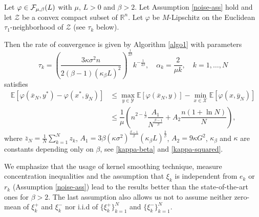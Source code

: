 \documentclass[runningheads]{llncs}
\def \R {\mathbb R}
\def\R{\mathbb{R}}
\newcommand{\E}{{\mathbb E}}
\def\R{\mathbb R}
\def\E{\mathbb E}
\begin{document}
\begin{theorem} \label{theorem_highorder_smooth_strongly_convex}
Let $\varphi \in {\cal F}_{\mu, \beta}(L)$ with $\mu$, $L > 0$ and $\beta > 2$. 
Let Assumption \ref{noise-ass} hold 
and let $\mathcal{Z}$ be a convex compact subset of $\R^n$.
Let $\varphi$ be $M$-Lipschitz on the Euclidean $\tau_1$-neighborhood of $\mathcal{Z}$ (see $\tau_k$ below). 

Then the rate of convergence is given by Algorithm \ref{algo1} with parameters
\begin{equation*}
    \tau_k = \left(\dfrac{3\kappa\sigma^2n}{2(\beta-1)(\kappa_\beta L)^2}\right)^{\frac{1}{2\beta}}k^{-\frac{1}{2\beta}}, \quad \alpha_k=\dfrac{2}{\mu k}, \quad k =1,\dots, N
\end{equation*}
satisfies 
\begin{equation*}
\begin{split}
    \E \left[ \varphi(\overline{x}_N, y^*) - \varphi(x^*, \overline{y}_N) \right] &\leq \max_{y\in \mathcal{Y}} \E \left[\varphi(\overline{x}_N, y)  \right] -
    \min_{x\in \mathcal{X}}\E \left[\varphi(x, \overline{y}_N) \right] \\
    &\leq \dfrac{1}{\mu} \left(n^{2-\frac{1}{\beta}}\dfrac{A_1}{N^{\frac{\beta-1}{\beta}}}+A_2\dfrac{n(1+\ln N)}{N} \right),
\end{split}
\end{equation*}
where $\overline{z}_N = \frac{1}{N}\sum\limits_{k=1}^N z_k$, $A_1=3\beta(\kappa \sigma^2)^{\frac{\beta-1}{\beta}}(\kappa_{\beta}L)^{\frac{2}{\beta}}$, $A_2=9\kappa G^2$, $\kappa_{\beta}$ and $\kappa$ are constants depending only on $\beta$, see \eqref{kappa-beta} and \eqref{kappa-squared}.
\end{theorem}

We emphasize that the usage of kernel smoothing technique, measure concentration inequalities and the assumption that $\xi_k$ is independent from $e_k$ or $r_k$ (Assumption \ref{noise-ass}) lead to the results better  than the state-of-the-art ones for $\beta > 2$. The last assumption also allows us not to assume neither zero-mean of $\xi^+_k$ and $\xi^-_k$ nor i.i.d of $\{\xi^+_k\}_{k=1}^{N}$ and $\{\xi^-_k\}_{k=1}^{N}$.
\end{document}
